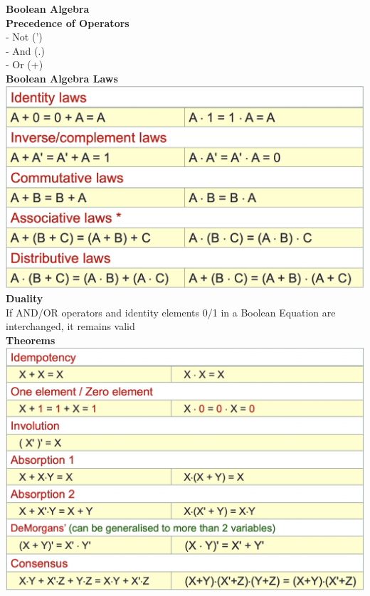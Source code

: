 \documentclass[10pt, a4paper]{article}
\begin{document}
\begin{multicols*}{3}
		{\normalsize\textbf{Boolean Algebra}}\\
		\textbf{Precedence of Operators}\\
		- Not (')\\
		- And (.)\\
		- Or (+)\\
		
		\textbf{Boolean Algebra Laws}\\
		\includegraphics[scale=.35]{./assets/booleanAlgebraLaws}\\
		
		\textbf{Duality}\\
		If AND/OR operators and identity elements 0/1 in a Boolean Equation are interchanged, it remains valid\\
		
		\textbf{Theorems}\\
		\includegraphics[scale=.35]{./assets/booleanAlgebraTheorems}\\
		

\end{multicols*}
\end{document}
